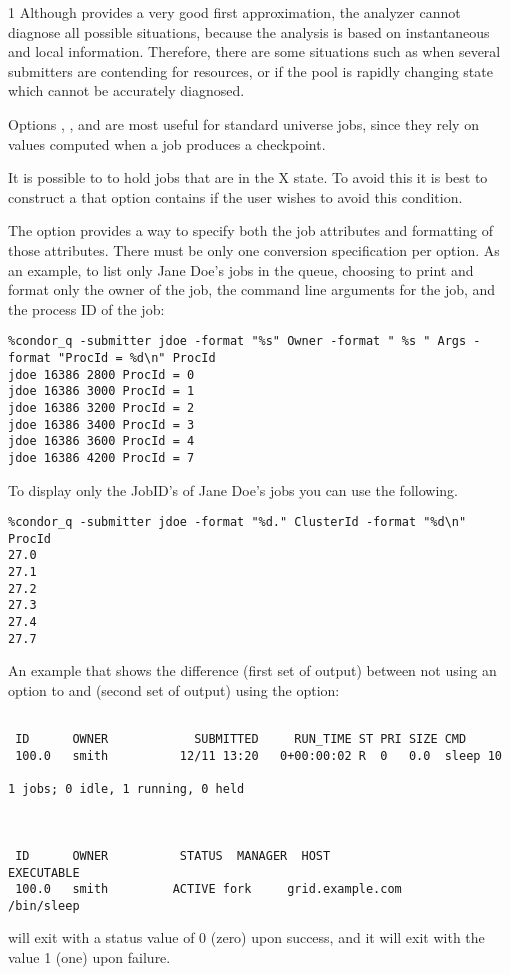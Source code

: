 \begin{ManPage}{\label{man-condor-q}}{1}
Although  provides a very good first approximation, the analyzer 
cannot diagnose all possible situations,
because the analysis is based on 
instantaneous and local information.  Therefore, there are some situations 
such as when several submitters are contending for resources, or if the pool 
is rapidly changing state which cannot be accurately diagnosed.

Options
, , and  are most useful for standard
universe jobs, since they rely on values computed when a job
produces a checkpoint.

It is possible to to hold jobs that are in the X state.
To avoid this it 
is best to construct a  that option contains
 if the user wishes to avoid this condition. 

\Examples

The  option provides a way to specify both the job attributes
and formatting of those attributes.
There must be only one conversion specification per  option.
As an example, to list only Jane Doe's jobs in the queue,
choosing to print and format only the owner of the job,
the command line arguments for the job, and the
process ID of the job:
\footnotesize
\begin{verbatim}
%condor_q -submitter jdoe -format "%s" Owner -format " %s " Args -format "ProcId = %d\n" ProcId
jdoe 16386 2800 ProcId = 0
jdoe 16386 3000 ProcId = 1
jdoe 16386 3200 ProcId = 2
jdoe 16386 3400 ProcId = 3
jdoe 16386 3600 ProcId = 4
jdoe 16386 4200 ProcId = 7
\end{verbatim}
\normalsize

To display only the JobID's of Jane Doe's jobs you can use the following.
\footnotesize
\begin{verbatim}
%condor_q -submitter jdoe -format "%d." ClusterId -format "%d\n" ProcId
27.0
27.1
27.2
27.3
27.4
27.7
\end{verbatim}
\normalsize

An example that shows the difference (first set of output)
between not using an option to  and (second
set of output) using the  option:
\footnotesize
\begin{verbatim}

 ID      OWNER            SUBMITTED     RUN_TIME ST PRI SIZE CMD
 100.0   smith          12/11 13:20   0+00:00:02 R  0   0.0  sleep 10

1 jobs; 0 idle, 1 running, 0 held



 ID      OWNER          STATUS  MANAGER  HOST                EXECUTABLE
 100.0   smith         ACTIVE fork     grid.example.com       /bin/sleep
\end{verbatim}
\normalsize

\ExitStatus

 will exit with a status value of 0 (zero) upon success,
and it will exit with the value 1 (one) upon failure.

\end{ManPage}
